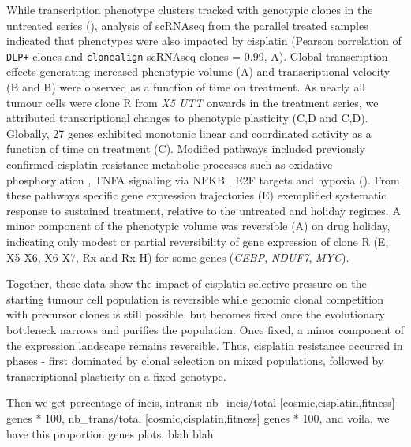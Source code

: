While transcription phenotype clusters tracked with genotypic clones in the untreated series (), analysis of scRNAseq from the parallel treated samples indicated that phenotypes were also impacted by cisplatin (Pearson correlation of \texttt{DLP+} clones and \texttt{clonealign} scRNAseq clones = 0.99, A). Global transcription effects generating increased phenotypic volume\cite{Azizi2018-eb} (A) and transcriptional velocity\cite{La_Manno2018-az} (B and B) were observed as a function of time on treatment.  As nearly all tumour cells were clone R from \textit{X5 UTT} onwards in the treatment series, we attributed transcriptional changes to phenotypic plasticity (C,D and C,D). Globally,  27 genes exhibited monotonic linear and coordinated activity as a function of time on treatment (C).
Modified pathways included previously confirmed cisplatin-resistance metabolic processes such as oxidative phosphorylation \cite{lee2017myc}, TNFA signaling via NFKB \cite{lagunas2008nuclear,ito2015down,ryan2019targeting}, E2F targets \cite{zheng2020upregulation} and hypoxia \cite{lee2012hypoxia,mcevoy2015identifying,deben2018hypoxia,li2019erk} (). From these pathways specific gene expression trajectories (E) exemplified systematic response to sustained treatment, relative to the untreated and holiday regimes. A minor component of the phenotypic volume was reversible (A) on drug holiday, indicating only modest or partial reversibility of gene expression of clone R (E, X5-X6, X6-X7, Rx and Rx-H) for some genes (\textit{CEBP}, \textit{NDUF7}, \textit{MYC}).

Together, these data show the impact of cisplatin selective pressure on the starting tumour cell population is reversible while genomic clonal competition with precursor clones is still possible, but becomes fixed once the evolutionary bottleneck narrows and purifies the population. Once fixed, a minor component of the expression landscape remains reversible. Thus, cisplatin resistance occurred in phases - first dominated by clonal selection on mixed populations, followed by transcriptional plasticity on a fixed genotype.



Then we get percentage of incis, intrans: nb\_incis/total [cosmic,cisplatin,fitness] genes * 100,  nb\_trans/total [cosmic,cisplatin,fitness] genes * 100, and voila, we have this proportion genes plots, blah blah







